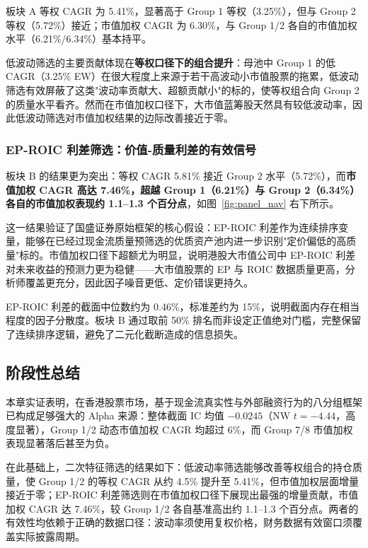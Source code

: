 \documentclass[a4paper,10pt]{article}
\begin{document}
板块 A 等权 CAGR 为 5.41\%，显著高于 Group 1 等权（3.25\%），但与 Group 2 等权（5.72\%）接近；市值加权 CAGR 为 6.30\%，与 Group 1/2 各自的市值加权水平（6.21\%/6.34\%）基本持平。

低波动筛选的主要贡献体现在\textbf{等权口径下的组合提升}：母池中 Group 1 的低 CAGR（3.25\% EW）在很大程度上来源于若干高波动小市值股票的拖累，低波动筛选有效屏蔽了这类"波动率贡献大、超额贡献小"的标的，使等权组合向 Group 2 的质量水平看齐。然而在市值加权口径下，大市值蓝筹股天然具有较低波动率，因此低波动筛选对市值加权结果的边际改善接近于零。

\subsubsection{EP-ROIC 利差筛选：价值-质量利差的有效信号}

板块 B 的结果更为突出：等权 CAGR 5.81\% 接近 Group 2 水平（5.72\%），而\textbf{市值加权 CAGR 高达 7.46\%，超越 Group 1（6.21\%）与 Group 2（6.34\%）各自的市值加权表现约 1.1--1.3 个百分点}，如图~\ref{fig:panel_nav} 右下所示。

这一结果验证了国盛证券原始框架的核心假设：EP-ROIC 利差作为连续排序变量，能够在已经过现金流质量预筛选的优质资产池内进一步识别"定价偏低的高质量"标的。市值加权口径下超额尤为明显，说明港股大市值公司中 EP-ROIC 利差对未来收益的预测力更为稳健——大市值股票的 EP 与 ROIC 数据质量更高，分析师覆盖更充分，因此因子噪音更低、定价错误更持久。

EP-ROIC 利差的截面中位数约为 0.46\%，标准差约为 15\%，说明截面内存在相当程度的因子分散度。板块 B 通过取前 50\% 排名而非设定正值绝对门槛，完整保留了连续排序逻辑，避免了二元化截断造成的信息损失。

\subsection{阶段性总结}

本章实证表明，在香港股票市场，基于现金流真实性与外部融资行为的八分组框架已构成足够强大的 Alpha 来源：整体截面 IC 均值 $-0.0245$（NW $t = -4.44$，高度显著），Group 1/2 动态市值加权 CAGR 均超过 6\%，而 Group 7/8 市值加权表现显著落后甚至为负。

在此基础上，二次特征筛选的结果如下：低波动率筛选能够改善等权组合的持仓质量，使 Group 1/2 的等权 CAGR 从约 4.5\% 提升至 5.41\%，但市值加权层面增量接近于零；EP-ROIC 利差筛选则在市值加权口径下展现出最强的增量贡献，市值加权 CAGR 达 7.46\%，较 Group 1/2 各自基准高出约 1.1--1.3 个百分点。两者的有效性均依赖于正确的数据口径：波动率须使用复权价格，财务数据有效窗口须覆盖实际披露周期。
\end{document}
